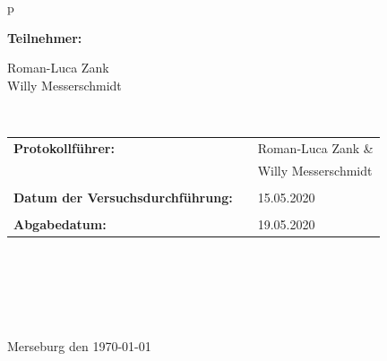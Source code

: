 \begin{center}
\begin{tabular}{p{\textwidth}}
\begin{center}
\Large{\textbf{Teilnehmer:}} \\ 
\end{center}
\begin{center}
\large{	%
		Roman-Luca Zank \\
		Willy Messerschmidt \\}
\end{center}


\\

\begin{center}
\begin{tabular}{lll}
\large{\textbf{Protokollführer:}} & & \large{Roman-Luca Zank \&} \\
&& \large{Willy Messerschmidt}\\
&&\\
\large{\textbf{Datum der Versuchsdurchführung:}}&& \large{15.05.2020}\\
&&\\
\large{\textbf{Abgabedatum:}}&& \large{19.05.2020}
\end{tabular}
\end{center}

\\ \\ \\ \\ \\ 
\large{Merseburg den \today}

\end{tabular}
\end{center}
